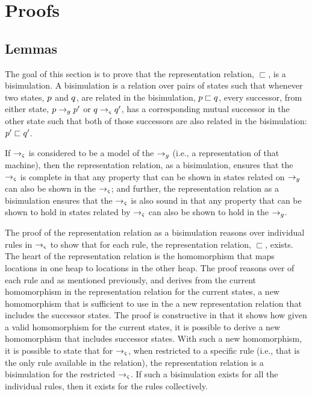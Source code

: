 \section{Proofs}
\subsection{Lemmas}

The goal of this section is to prove that the representation relation,
$\sqsubset$, is a bisimulation.  A bisimulation is a relation over pairs of states such that whenever two states, $p$ and
$q$, are related in the bisimulation, $p \sqsubset
q$, every successor, from either state, $p
\rightarrow_{g} p^\prime$ or $q \rightarrow_{\varsigma}
q^\prime$, has a corresponding mutual successor in the other
state such that both of those successors are also related in the
bisimulation: $p^\prime \sqsubset q^\prime$.

If $\rightarrow_{\varsigma}$ is considered to be a model of the
$\rightarrow_{g}$ (i.e., a representation of that machine), then the
representation relation, as a bisimulation, ensures that the
$\rightarrow_{\varsigma}$ is complete in that any property that can be
shown in states related on $\rightarrow_{g}$ can also be shown in the
$\rightarrow_{\varsigma}$; and further, the representation relation as a
bisimulation ensures that the $\rightarrow_{\varsigma}$ is also sound in
that any property that can be shown to hold in states related by $\rightarrow_{\varsigma}$
can also be shown to hold in the $\rightarrow_{g}$.

The proof of the representation relation as a bisimulation reasons
over individual rules in $\rightarrow_{\varsigma}$ to show that for
each rule, the representation relation, $\sqsubset$, exists. The heart
of the representation relation is the homomorphism that maps locations
in one heap to locations in the other heap. The proof reasons over of
each rule and as mentioned previously, and derives from the current
homomorphism in the representation relation for the current states, a
new homomorphism that is sufficient to use in the a new representation
relation that includes the successor states. The proof is constructive
in that it shows how given a valid homomorphism for the current
states, it is possible to derive a new homomorphism that includes
successor states. With such a new homomorphism, it is possible to
state that for $\rightarrow_{\varsigma}$, when restricted to a specific
rule (i.e., that is the only rule available in the relation), the
representation relation is a bisimulation for the restricted
$\rightarrow_{\varsigma}$. If such a bisimulation exists for all the
individual rules, then it exists for the rules collectively.

